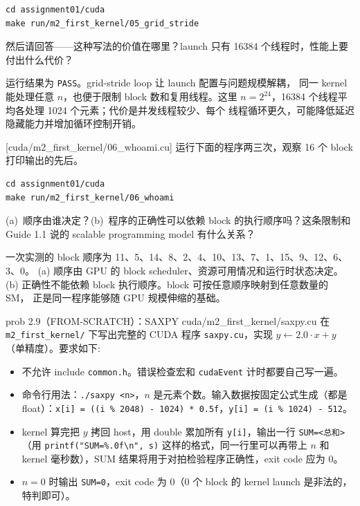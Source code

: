 \documentclass[11pt,a4paper,fontset=fandol]{ctexart}
\begin{document}
\begin{lstlisting}
cd assignment01/cuda
make run/m2_first_kernel/05_grid_stride
\end{lstlisting}

然后请回答——这种写法的价值在哪里？launch 只有 16384 个线程时，性能上要付出什么代价？

\begin{answer}
运行结果为 \texttt{PASS}。grid-stride loop 让 launch 配置与问题规模解耦，
同一 kernel 能处理任意 $n$，也便于限制 block 数和复用线程。这里
$n=2^{24}$，16384 个线程平均各处理 1024 个元素；代价是并发线程较少、每个
线程循环更久，可能降低延迟隐藏能力并增加循环控制开销。
\end{answer}

[cuda/m2\_first\_kernel/06\_whoami.cu]
运行下面的程序两三次，观察 16 个 block 打印输出的先后。

\begin{lstlisting}
cd assignment01/cuda
make run/m2_first_kernel/06_whoami
\end{lstlisting}

(a)~顺序由谁决定？(b)~程序的正确性可以依赖 block 的执行顺序吗？这条限制和 Guide 1.1 说的 scalable programming model 有什么关系？

\begin{answer}
一次实测的 block 顺序为
11、5、14、8、2、4、10、13、7、1、15、9、12、6、3、0。
(a) 顺序由 GPU 的 block scheduler、资源可用情况和运行时状态决定。
(b) 正确性不能依赖 block 执行顺序。block 可按任意顺序映射到任意数量的 SM，
正是同一程序能够随 GPU 规模伸缩的基础。
\end{answer}

\begin{capstone}{prob 2.9（FROM-SCRATCH）：SAXPY \hfill {\footnotesize\ttfamily cuda/m2\_first\_kernel/saxpy.cu}}
在 \texttt{m2\_first\_kernel/} 下写出完整的 CUDA 程序 \texttt{saxpy.cu}，实现 $y \leftarrow 2.0 \cdot x + y$（单精度）。要求如下:
\begin{itemize}
  \item 不允许 include \texttt{common.h}。错误检查宏和 \texttt{cudaEvent} 计时都要自己写一遍。
  \item 命令行用法：\texttt{./saxpy <n>}，$n$ 是元素个数。输入数据按固定公式生成（都是 float）：\texttt{x[i] = ((i \% 2048) - 1024) * 0.5f}，\texttt{y[i] = (i \% 1024) - 512}。
  \item kernel 算完把 $y$ 拷回 host，用 double 累加所有 \texttt{y[i]}，输出一行 \texttt{SUM=<总和>}（用 \texttt{printf("SUM=\%.0f\textbackslash n", s)} 这样的格式，同一行里可以再带上 $n$ 和 kernel 毫秒数），SUM 结果将用于对拍检验程序正确性，exit code 应为 0。
  \item $n = 0$ 时输出 \texttt{SUM=0}，exit code 为 0（0 个 block 的 kernel launch 是非法的，特判即可）。
\end{itemize}
\end{capstone}
\end{document}
